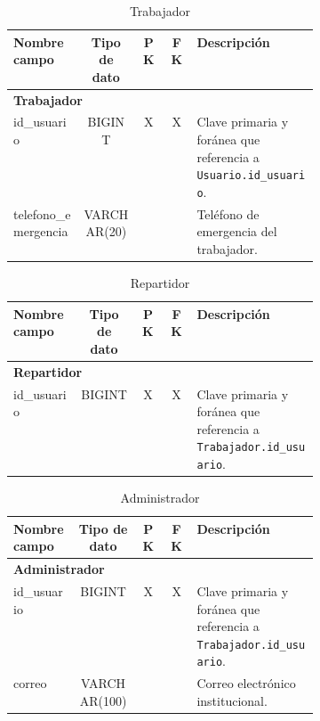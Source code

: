 \documentclass[12pt,a4paper]{article}
\begin{document}
\begin{table}[h!]
\centering
\begin{tabular}{|l|c|c|c|p{0.4\linewidth}|}
\hline
\textbf{Nombre campo}      & \textbf{Tipo de dato} & \textbf{PK} & \textbf{FK} & \textbf{Descripción} \\
\hline
\multicolumn{5}{|l|}{\textbf{Trabajador}} \\
\hline
id\_usuario                & BIGINT                & X           & X           & Clave primaria y foránea que referencia a \texttt{Usuario.id\_usuario}. \\
telefono\_emergencia       & VARCHAR(20)           &             &             & Teléfono de emergencia del trabajador. \\
\hline
\end{tabular}
\caption{Trabajador}
\label{table:trabajador}
\end{table}


\begin{table}[h!]
\centering
\begin{tabular}{|l|c|c|c|p{0.4\linewidth}|}
\hline
\textbf{Nombre campo}      & \textbf{Tipo de dato} & \textbf{PK} & \textbf{FK} & \textbf{Descripción} \\
\hline
\multicolumn{5}{|l|}{\textbf{Repartidor}} \\
\hline
id\_usuario                & BIGINT                & X           & X           & Clave primaria y foránea que referencia a \texttt{Trabajador.id\_usuario}. \\
\hline
\end{tabular}
\caption{Repartidor}
\label{table:repartidor}
\end{table}


\begin{table}[h!]
\centering
\begin{tabular}{|l|c|c|c|p{0.4\linewidth}|}
\hline
\textbf{Nombre campo}      & \textbf{Tipo de dato} & \textbf{PK} & \textbf{FK} & \textbf{Descripción} \\
\hline
\multicolumn{5}{|l|}{\textbf{Administrador}} \\
\hline
id\_usuario                & BIGINT                & X           & X           & Clave primaria y foránea que referencia a \texttt{Trabajador.id\_usuario}. \\
correo                     & VARCHAR(100)          &             &             & Correo electrónico institucional. \\
\hline
\end{tabular}
\caption{Administrador}
\label{table:administrador}
\end{table}
\end{document}
